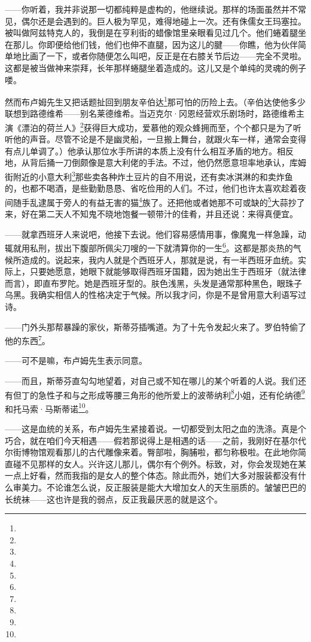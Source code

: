 \par ——你听着，我并非说那一切都纯粹是虚构的，他继续说。那样的场面虽然并不常见，偶尔还是会遇到的。巨人极为罕见，难得地碰上一次。还有侏儒女王玛塞拉。被叫做阿兹特克人的，我倒是在亨利街的蜡像馆里亲眼看见过几个。他们蜷着腿坐在那儿。你即便给他们钱，他们也伸不直腿，因为这儿的腱——你瞧，他为伙伴简单地比画了一下，或者你随便怎么叫吧，反正是在右膝关节后边——完全不灵啦。这都是被当做神来崇拜，长年那样蜷腿坐着造成的。这儿又是个单纯的灵魂的例子喽。
\par 然而布卢姆先生又把话题扯回到朋友辛伯达\footnote{}那可怕的历险上去。（辛伯达使他多少联想到路德维希——别名莱德维希。当迈克尔·冈恩经营欢乐剧场时，路德维希主演《漂泊的荷兰人》\footnote{}获得巨大成功，爱慕他的观众蜂拥而至，个个都只是为了听听他的声音。尽管不论是不是幽灵船，一旦搬上舞台，就跟火车一样，通常会变得有点儿单调了。）他承认那位水手所讲的本质上没有什么相互矛盾的地方。相反地，从背后捅一刀倒颇像是意大利佬的手法。不过，他仍然愿意坦率地承认，库姆街附近的小意大利\footnote{}那些卖各种炸土豆片的自不用说，还有卖冰淇淋的和卖炸鱼的，也都不喝酒，是些勤勤恳恳、省吃俭用的人们。不过，他们也许太喜欢趁着夜间随手乱逮属于旁人的有益无害的猫\footnote{}族了。还把他或者她那不可或缺的\footnote{}大蒜抄了来，好在第二天人不知鬼不晓地饱餐一顿带汁的佳肴，并且还说：来得真便宜。
\par ——就拿西班牙人来说吧，他接下去说。他们容易感情用事，像魔鬼一样急躁，动辄就用私刑，拔出下腹部所佩尖刀嗖的一下就清算你的一生\footnote{}。这都是那炎热的气候所造成的。说起来，我内人就是个西班牙人，那就是说，有一半西班牙血统。实际上，只要她愿意，她眼下就能够取得西班牙国籍，因为她出生于西班牙（就法律而言），即直布罗陀。她是西班牙型的。肤色浅黑，头发是通常那种黑色，眼珠子乌黑。我确实相信人的性格决定于气候。所以我才问，你是不是曾用意大利语写过诗。
\par ——门外头那帮暴躁的家伙，斯蒂芬插嘴道。为了十先令发起火来了。罗伯特偷了他的东西\footnote{}。
\par ——可不是嘛，布卢姆先生表示同意。
\par ——而且，斯蒂芬直勾勾地望着，对自己或不知在哪儿的某个听着的人说。我们还有但丁的急性子和与之形成等腰三角形的他所爱上的波蒂纳利\footnote{}小姐，还有伦纳德\footnote{}和托马索·马斯蒂诺\footnote{}。
\par ——这是血统的关系，布卢姆先生紧接着说。一切都受到太阳之血的洗涤。真是个巧合，就在咱们今天相遇——假若那说得上是相遇的话——之前，我刚好在基尔代尔街博物馆观看那儿的古代雕像来着。臀部啦，胸脯啦，都匀称极啦。在此地你简直碰不见那样的女人。兴许这儿那儿，偶尔有个例外。标致，对，你会发现她在某一点上好看，然而我指的是女人的整个体态。除此而外，她们大多对服装都没有什么审美力。不论谁怎么说，反正服装是能大大增加女人的天生丽质的。皱皱巴巴的长统袜——这也许是我的弱点，反正我最厌恶的就是这个。
